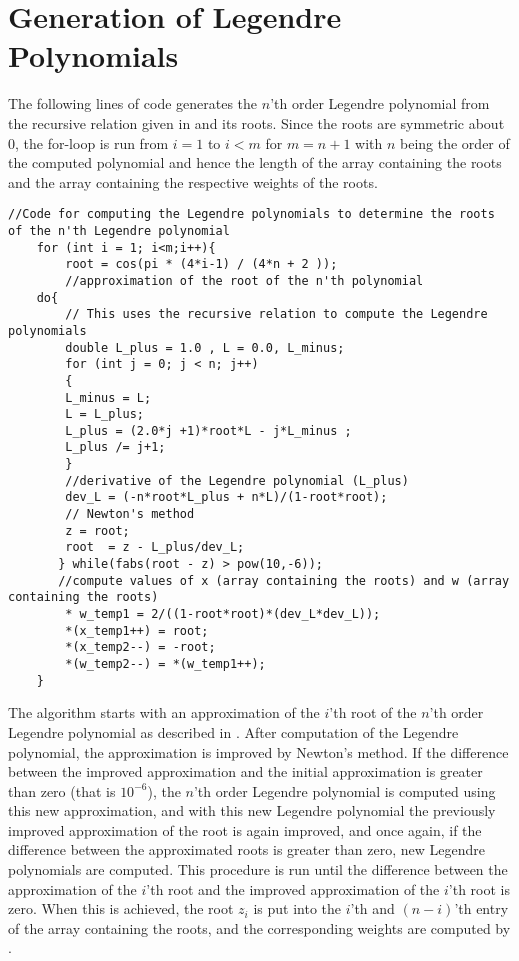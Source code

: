 \section{Generation of Legendre Polynomials}
\label{sec:GenerationOfLegendrePolynomials}
The following lines of code generates the $n$'th order Legendre polynomial from the recursive relation given in  and its roots.
Since the roots are symmetric about $0$, the for-loop is run from $i=1$ to $i<m$ for $m = n+1$ with $n$ being the order of the computed polynomial and hence the length of the array containing the roots and the array containing the respective weights of the roots. 
\begin{lstlisting}
//Code for computing the Legendre polynomials to determine the roots of the n'th Legendre polynomial
    for (int i = 1; i<m;i++){
        root = cos(pi * (4*i-1) / (4*n + 2 ));  
        //approximation of the root of the n'th polynomial
    do{
        // This uses the recursive relation to compute the Legendre polynomials
        double L_plus = 1.0 , L = 0.0, L_minus;
        for (int j = 0; j < n; j++)
        {
        L_minus = L;
        L = L_plus;
        L_plus = (2.0*j +1)*root*L - j*L_minus ;
        L_plus /= j+1;
        }
		//derivative of the Legendre polynomial (L_plus)
        dev_L = (-n*root*L_plus + n*L)/(1-root*root);   
        // Newton's method
        z = root;
        root  = z - L_plus/dev_L;                   
       } while(fabs(root - z) > pow(10,-6));
       //compute values of x (array containing the roots) and w (array containing the roots)
        * w_temp1 = 2/((1-root*root)*(dev_L*dev_L));
        *(x_temp1++) = root;
        *(x_temp2--) = -root;
        *(w_temp2--) = *(w_temp1++);
    }
\end{lstlisting}
The algorithm starts with an approximation of the $i$'th root of the $n$'th order Legendre polynomial as described in . 
After computation of the Legendre polynomial, the approximation is improved by Newton's method.
If the difference between the improved approximation and the initial approximation is greater than zero (that is $10^{-6}$), the $n$'th order Legendre polynomial is computed using this new approximation, and with this new Legendre polynomial the previously improved approximation of the root is again improved, and once again, if the difference between the approximated roots is greater than zero, new Legendre polynomials are computed.  
This procedure is run until the difference between the approximation of the $i$'th root and the improved approximation of the $i$'th root is zero.
When this is achieved, the root $z_i$ is put into the $i$'th and $(n-i)$'th entry of the array containing the roots, and the corresponding weights are computed by .

